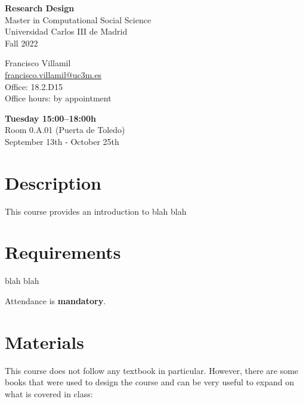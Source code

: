 \documentclass[12pt, a4paper]{article}
\begin{document}
\begin{center}
{\LARGE\bf Research Design}\\\vspace{10pt}
Master in Computational Social Science\\
Universidad Carlos III de Madrid\\\vspace{10pt}
{\large Fall 2022}\\
\end{center}

\vspace{20pt}

\begin{minipage}{0.49\textwidth}
\centering
Francisco Villamil\\
\href{francisco.villamil@uc3m.es}{francisco.villamil@uc3m.es}\\
Office: 18.2.D15\\
Office hours: by appointment
\end{minipage}\hfill
\begin{minipage}{0.49\textwidth}
\centering
\textbf{Tuesday 15:00--18:00h}\\Room 0.A.01 (Puerta de Toledo)\\September 13th - October 25th\\
\end{minipage}


\vspace{10pt}
\section{Description}

This course provides an introduction to blah blah

\section{Requirements}

blah blah

Attendance is \textbf{mandatory}.

\section{Materials}

This course does not follow any textbook in particular.
However, there are some books that were used to design the course and can be very useful to expand on what is covered in class:
\end{document}
